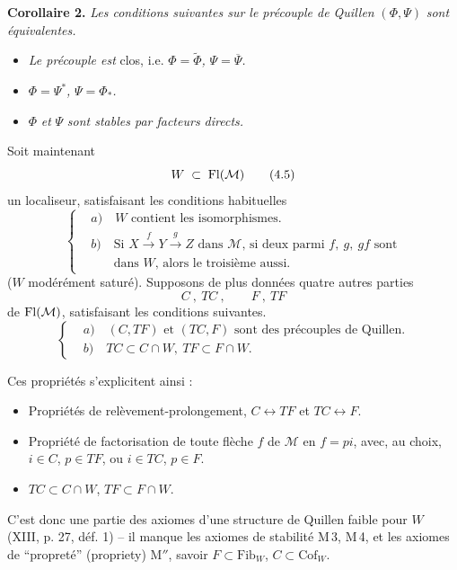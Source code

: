 \textbf{Corollaire 2.} \textit{Les conditions suivantes sur le précouple de Quillen} $(\Phi,\Psi)$ \textit{sont équivalentes.}
\begin{itemize}[leftmargin=2.5em]
\item[a)] \textit{Le précouple est} clos, i.e. $\Phi=\widetilde{\Phi}$\textit{,} $\Psi=\overline{\Psi}$\textit{.}
\item[b)] $\Phi=\Psi^*$\textit{,} $\Psi=\Phi_*$\textit{.}
\item[c)] $\Phi$ \textit{et} $\Psi$ \textit{sont stables par facteurs directs.}
\end{itemize}
Soit maintenant
\[
W \;\subset\; \mathrm{Fl}(\mathcal{M})
\tag*{(4.5)}
\]
un localiseur, satisfaisant les conditions habituelles
\[
\left\{
\begin{aligned}
&\textit{a})\quad W \text{ contient les isomorphismes.}\\[1ex]
&\textit{b})\quad \text{Si } X\xrightarrow{\;f\;}Y\xrightarrow{\;g\;}Z \text{ dans } \mathcal{M}\text{, si deux parmi } f,\ g,\ gf \text{ sont}\\
&\phantom{\textit{b})}\quad \text{dans } W\text{, alors le troisième aussi.}
\end{aligned}
\right.
\tag*{(4.6)}
\]
($W$ modérément saturé). Supposons de plus données quatre autres parties
\[
C\ ,\ TC\ , \qquad F\ ,\ TF
\tag*{(4.7)}
\]
de $\mathrm{Fl}(\mathcal{M})$, satisfaisant les conditions suivantes.
\[
\left\{
\begin{aligned}
&\textit{a})\quad (C,TF) \text{ et } (TC,F) \text{ sont des précouples de Quillen.}\\[1ex]
&\textit{b})\quad TC\subset C\cap W,\ TF\subset F\cap W.
\end{aligned}
\right.
\tag*{(4.8)}
\]

Ces propriétés s'explicitent ainsi :
\begin{itemize}[leftmargin=2.5em]
\item[\textbf{M\,1}] Propriétés de relèvement-prolongement, $C\longleftrightarrow TF$ et $TC\longleftrightarrow F$.
\item[\textbf{M\,2}] Propriété de factorisation de toute flèche $f$ de $\mathcal{M}$ en $f=pi$, avec, au choix, $i\in C$, $p\in TF$, ou $i\in TC$, $p\in F$.
\item[\textbf{M$'$}] $TC\subset C\cap W$, $TF\subset F\cap W$.
\end{itemize}

C'est donc une partie des axiomes d'une structure de Quillen faible pour $W$ (XIII, p. 27, déf. 1) -- il manque les axiomes de stabilité M\,3, M\,4, et les axiomes de “propreté” (propriety) M$''$, savoir $F\subset\mathrm{Fib}_W$, $C\subset\mathrm{Cof}_W$.


